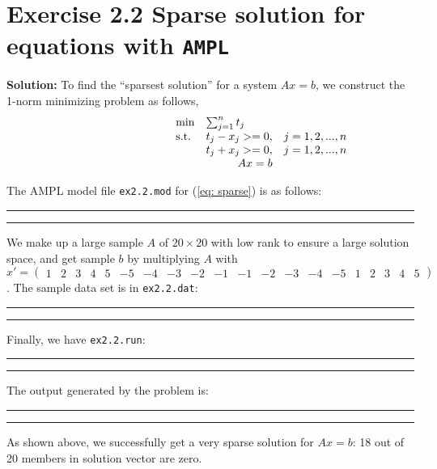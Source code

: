 \section{Exercise 2.2 Sparse solution for equations with {\tt AMPL}}
\textbf{Solution:}
To find the ``sparsest solution'' for a system $Ax=b$, we construct the 1-norm minimizing problem as follows,
\begin{equation}
\label{eq: sparse}
  \begin{array}{lrcll}
    \min
    & \multicolumn{4}{l}{\sum_{j=1}^{n} t_j} \\
    \text{s.t.}
    & t_j-x_j >=0,& j=1,2,...,n\\
    & t_j+x_j >=0,& j=1,2,...,n\\
    & Ax=b &
  \end{array}
\end{equation}

The AMPL model file {\tt ex2.2.mod} for (\ref{eq: sparse}) is as follows:

\bigskip
\hrule
\small

\normalsize
\hrule
\bigskip

We make up a large sample $A$ of $20\times 20$ with low rank to ensure a large solution space, and get sample $b$ by multiplying $A$ with $x'=\left( \begin{array}{cccccccccccccccccccc}1&2&3&4&5&-5 &-4& -3 &-2& -1& -1& -2& -3& -4 &-5& 1& 2& 3& 4 &5\end{array}\right) $. The sample data set is in {\tt ex2.2.dat}:

\bigskip
\hrule
\footnotesize

\normalsize
\hrule
\bigskip

Finally, we have {\tt ex2.2.run}:

\bigskip
\hrule
\small

\normalsize
\hrule
\bigskip

The output generated by the problem is:

\bigskip
\hrule
\small

\normalsize
\hrule
\bigskip

As shown above, we successfully get a very sparse solution for $Ax=b$: 18 out of 20 members in solution vector are zero.
